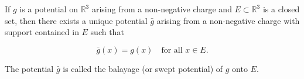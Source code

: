If $g$ is a potential on $\mathbb{R}^3$ arising from a non-negative charge and $E \subset \mathbb{R}^3$ is a closed set, then there exists a unique potential $\bar{g}$ arising from a non-negative charge with support contained in $E$ such that

$$\bar{g}(x) = g(x) \quad \text{for all } x \in E.$$

The potential $\bar{g}$ is called the balayage (or swept potential) of $g$ onto $E$.
